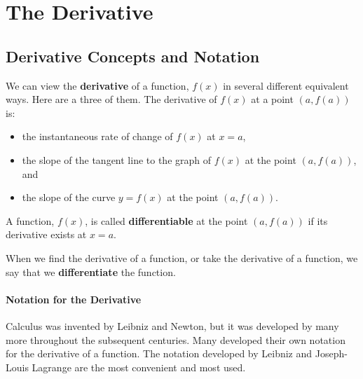 \section{The Derivative}
\label{sec:derivative}

\subsection{Derivative Concepts and Notation}

\begin{definition}
We can view the {\bf derivative} of a function, $f(x)$ in several different equivalent ways. Here are a three of them. The derivative of $f(x)$ at a point $(a, f(a))$ is:
    \begin{itemize}
    \item the instantaneous rate of change of $f(x)$ at $x=a$, 
    \item the slope of the tangent line to the graph of $f(x)$ at the point $(a,f(a))$, and
    \item the slope of the curve $y=f(x)$ at the point $(a,f(a))$.
    \end{itemize}
\end{definition}

\begin{definition}
A function, $f(x)$, is called {\bf differentiable} at the point $(a,f(a))$ if its derivative exists at $x=a$.
\end{definition}

\begin{definition}
When we find the derivative of a function, or take the derivative of a function, we say that we {\bf differentiate} the function.
\end{definition}

\paragraph*{Notation for the Derivative}
Calculus was invented by Leibniz and Newton, but it was developed by many more throughout the subsequent centuries. Many developed their own notation for the derivative of a function. The notation developed by Leibniz and Joseph-Louis Lagrange are the most convenient and most used. 

